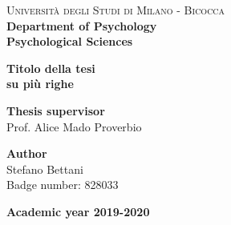 \begin{titlepage}
	
	\noindent
	\begin{minipage}[t]{0.19\textwidth}
	\end{minipage}
	\begin{minipage}[t]{0.81\textwidth}
	{
			{\textsc{Università degli Studi di Milano - Bicocca}} \\
			\textbf{Department of Psychology} \\
			\textbf{Psychological Sciences} \\
			\par
	}
	\end{minipage}
	
\vspace{40mm}
	
\begin{center}
		{\LARGE{
				\textbf{Titolo della tesi \\ su più righe}
				\par
		}}
	\end{center}
	
	\vspace{50mm}

	\noindent
	{\large \textbf{Thesis supervisor}} \\
	\large{Prof. Alice Mado Proverbio } \\

	\vspace{15mm}

	\begin{flushright}
		{\large \textbf{Author}} \\
		\large{Stefano Bettani} \\
		\large{Badge number: 828033} 
	\end{flushright}
	
	\vspace{30mm}
	\begin{center}
		{\large{\bf Academic year 2019-2020}}
	\end{center}

	\restoregeometry
	
\end{titlepage}
